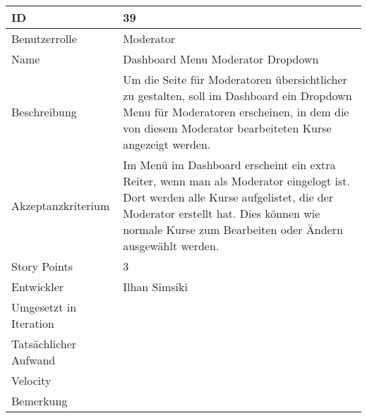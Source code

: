 \begin{tabularx}{\textwidth}{|p{}|X|}
	\hline
	ID & 39 \\
	\hline
	Benutzerrolle & Moderator \\
	\hline
	Name & Dashboard Menu Moderator Dropdown\\
	\hline
	Beschreibung & Um die Seite für Moderatoren übersichtlicher zu gestalten, soll im Dashboard ein Dropdown Menu für Moderatoren erscheinen, in dem die von diesem Moderator bearbeiteten Kurse angezeigt werden. \\
	\hline
	Akzeptanzkriterium & Im Menü im Dashboard erscheint ein extra Reiter, wenn man als Moderator eingelogt ist. Dort werden alle Kurse aufgelistet, die der Moderator erstellt hat. Dies können wie normale Kurse zum Bearbeiten oder Ändern ausgewählt werden. \\
	\hline
	Story Points & 3\\
	\hline
	Entwickler & Ilhan Simsiki\\
	\hline
	Umgesetzt in Iteration & \\
	\hline
	Tatsächlicher Aufwand & \\
	\hline
	Velocity & \\
	\hline
	Bemerkung & \\
	\hline
\end{tabularx}
\vspace{20pt}
